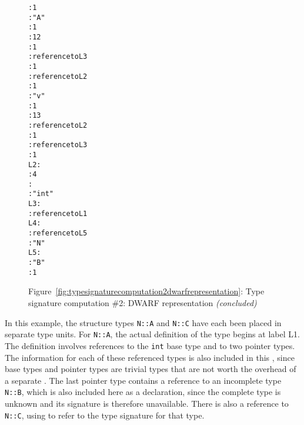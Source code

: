 \begin{figure}
\begin{dwflisting}
\begin{alltt}
      \DWTAGsubprogram
           \DWATexternal : 1
           \DWATname : "A"
           \DWATdeclfile : 1
           \DWATdeclline : 12
           \DWATdeclaration : 1
        \DWTAGformalparameter
           \DWATtype : reference to L3
           \DWATartificial : 1
        \DWTAGformalparameter
           \DWATtype : reference to L2
       \DWTAGsubprogram
           \DWATexternal : 1
           \DWATname : "v"
           \DWATdeclfile : 1
           \DWATdeclline : 13
           \DWATtype : reference to L2
           \DWATdeclaration : 1
         \DWTAGformalparameter
           \DWATtype : reference to L3
           \DWATartificial : 1
L2:
    \DWTAGbasetype
         \DWATbytesize : 4
         \DWATencoding : \DWATEsigned
         \DWATname : "int"
L3:
    \DWTAGpointertype
         \DWATtype : reference to L1
L4:
    \DWTAGpointertype
         \DWATtype : reference to L5
    \DWTAGnamespace
         \DWATname : "N"
L5:
       \DWTAGstructuretype
           \DWATname : "B"
           \DWATdeclaration : 1
\end{alltt}
\end{dwflisting}
\begin{center}
\vspace{3mm}
Figure~\ref{fig:typesignaturecomputation2dwarfrepresentation}: Type signature computation \#2: DWARF representation \textit{(concluded)}
\end{center}
\end{figure}

In this example, the structure types \texttt{N::A} and \texttt{N::C} have each
been placed in separate 
type units.  For \texttt{N::A}, the actual
definition of the type begins at label L1. The definition
involves references to the \texttt{int} base type and to two pointer
types. The information for each of these referenced types is
also included in this , 
since base types and pointer
types are trivial types that are not worth the overhead of a
separate . 
The last pointer type contains a reference
to an incomplete type \texttt{N::B}, which is also included here as
a declaration, since the complete type is unknown and its
signature is therefore unavailable. There is also a reference
to \texttt{N::C}, using 
\DWFORMrefsigeight{} to refer to the type signature
 for that type.

